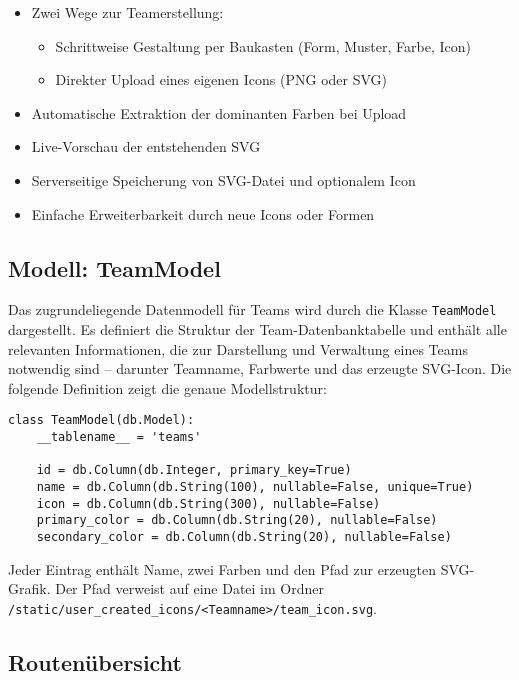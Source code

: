 \documentclass[12pt]{article}
\begin{document}
\begin{itemize}
  \item Zwei Wege zur Teamerstellung:
  \begin{itemize}
    \item Schrittweise Gestaltung per Baukasten (Form, Muster, Farbe, Icon)
    \item Direkter Upload eines eigenen Icons (PNG oder SVG)
  \end{itemize}
  \item Automatische Extraktion der dominanten Farben bei Upload
  \item Live-Vorschau der entstehenden SVG
  \item Serverseitige Speicherung von SVG-Datei und optionalem Icon
  \item Einfache Erweiterbarkeit durch neue Icons oder Formen
\end{itemize}

\subsection{Modell: TeamModel}

Das zugrundeliegende Datenmodell für Teams wird durch die Klasse \texttt{TeamModel} dargestellt. Es definiert die Struktur der Team-Datenbanktabelle und enthält alle relevanten Informationen, die zur Darstellung und Verwaltung eines Teams notwendig sind – darunter Teamname, Farbwerte und das erzeugte SVG-Icon. Die folgende Definition zeigt die genaue Modellstruktur:

\begin{verbatim}
class TeamModel(db.Model):
    __tablename__ = 'teams'

    id = db.Column(db.Integer, primary_key=True)
    name = db.Column(db.String(100), nullable=False, unique=True)
    icon = db.Column(db.String(300), nullable=False)
    primary_color = db.Column(db.String(20), nullable=False)
    secondary_color = db.Column(db.String(20), nullable=False)
\end{verbatim}

\noindent Jeder Eintrag enthält Name, zwei Farben und den Pfad zur erzeugten SVG-Grafik. Der Pfad verweist auf eine Datei im Ordner \texttt{/static/user\_created\_icons/<Teamname>/team\_icon.svg}.

\subsection{Routenübersicht}
\end{document}
